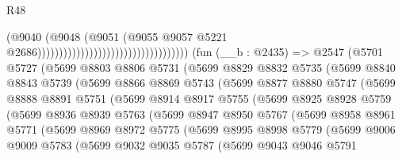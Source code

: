\begin{lexlean}{R48}
\begin{coremodule}
                                                                  (@9040
                                                                    (@9048
                                                                      (@9051
                                                                        (@9055
                                                                          @9057
                                                                          @5221
                                                                          @2686)))))))))))))))))))))))))))))))))))
    (fun (__b : @2435) =>
    @2547
      (@5701
        @5727
        (@5699
          @8803
          @8806
          @5731
          (@5699
            @8829
            @8832
            @5735
            (@5699
              @8840
              @8843
              @5739
              (@5699
                @8866
                @8869
                @5743
                (@5699
                  @8877
                  @8880
                  @5747
                  (@5699
                    @8888
                    @8891
                    @5751
                    (@5699
                      @8914
                      @8917
                      @5755
                      (@5699
                        @8925
                        @8928
                        @5759
                        (@5699
                          @8936
                          @8939
                          @5763
                          (@5699
                            @8947
                            @8950
                            @5767
                            (@5699
                              @8958
                              @8961
                              @5771
                              (@5699
                                @8969
                                @8972
                                @5775
                                (@5699
                                  @8995
                                  @8998
                                  @5779
                                  (@5699
                                    @9006
                                    @9009
                                    @5783
                                    (@5699
                                      @9032
                                      @9035
                                      @5787
                                      (@5699
                                        @9043
                                        @9046
                                        @5791

\end{coremodule}
\end{lexlean}
